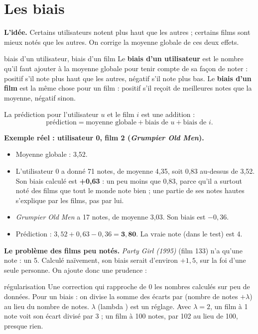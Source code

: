 \documentclass[11pt,a4paper]{article}
\begin{document}
\section{Les biais}\label{sec:biais}

\textbf{L'idée.} Certains utilisateurs notent plus haut que les autres ; certains films
sont mieux notés que les autres. On corrige la moyenne globale de ces deux effets.

\begin{definition}{biais d'un utilisateur, biais d'un film}
Le \textbf{biais d'un utilisateur} est le nombre qu'il faut ajouter à la moyenne globale
pour tenir compte de sa façon de noter : positif s'il note plus haut que les autres,
négatif s'il note plus bas. Le \textbf{biais d'un film} est la même chose pour un film :
positif s'il reçoit de meilleures notes que la moyenne, négatif sinon.
\end{definition}

La prédiction pour l'utilisateur $u$ et le film $i$ est une addition :
\[
  \text{prédiction} = \text{moyenne globale} + \text{biais de } u + \text{biais de } i .
\]

\textbf{Exemple réel : utilisateur 0, film 2 (\emph{Grumpier Old Men}).}
\begin{itemize}
  \item Moyenne globale : 3,52.
  \item L'utilisateur 0 a donné 71 notes, de moyenne 4,35, soit 0,83 au-dessus de 3,52.
        Son biais calculé est \textbf{+0,63} : un peu moins que 0,83, parce qu'il a
        surtout noté des films que tout le monde note bien ; une partie de ses notes
        hautes s'explique par les films, pas par lui.
  \item \emph{Grumpier Old Men} a 17 notes, de moyenne 3,03. Son biais est \textbf{$-0{,}36$}.
  \item Prédiction : $3{,}52 + 0{,}63 - 0{,}36 = \mathbf{3{,}80}$. La vraie note (dans le
        test) est 4.
\end{itemize}

\textbf{Le problème des films peu notés.} \emph{Party Girl (1995)} (film 133) n'a qu'une
note : un 5. Calculé naïvement, son biais serait d'environ $+1{,}5$, sur la foi d'une
seule personne. On ajoute donc une prudence :

\begin{definition}{régularisation}
Une correction qui rapproche de 0 les nombres calculés sur peu de données. Pour un biais :
on divise la somme des écarts par (nombre de notes $+ \lambda$) au lieu du nombre de notes.
$\lambda$ (\og lambda \fg) est un réglage. Avec $\lambda = 2$, un film à 1 note voit son
écart divisé par 3 ; un film à 100 notes, par 102 au lieu de 100, presque rien.
\end{definition}
\end{document}
